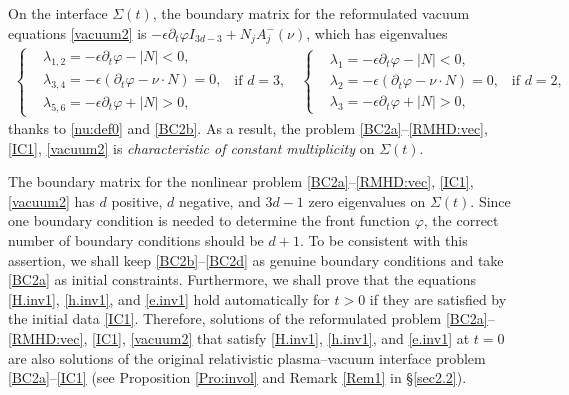 \documentclass[twoside,11pt]{article}
\numberwithin{equation}{section}
\def\p{\partial}
\begin{document}

On the interface $\Sigma(t)$,  the boundary matrix
for the reformulated vacuum equations \eqref{vacuum2}
is $-\epsilon\p_t\varphi I_{3d-3}+N_jA_j^-(\nu)$,
which has eigenvalues
\begin{align*}
\left\{
\begin{aligned}
	&\lambda_{1,2}=-\epsilon\p_t\varphi-|N|<0, \\
	& \lambda_{3,4}=-\epsilon(\p_t\varphi-\nu\cdot N)=0,\\
	& \lambda_{5,6}=-\epsilon\p_t\varphi+|N|>0,
\end{aligned}
\right.\ \  \textrm{if }d=3,\quad
\left\{
\begin{aligned}
	& \lambda_{1}=-\epsilon\p_t\varphi-|N|<0,\\
	& \lambda_{2}=-\epsilon(\p_t\varphi-\nu \cdot N)=0, \\
	& \lambda_{3}=-\epsilon\p_t\varphi+|N|>0,
\end{aligned}
\right.\ \ \textrm{if }d=2,
\end{align*}
thanks to	\eqref{nu:def0} and \eqref{BC2b}.
	As a result, the problem \eqref{BC2a}--\eqref{RMHD:vec}, \eqref{IC1}, \eqref{vacuum2} is {\it characteristic of constant multiplicity} on $\Sigma(t)$.

The boundary matrix for the nonlinear
problem \eqref{BC2a}--\eqref{RMHD:vec}, \eqref{IC1}, \eqref{vacuum2}
 has $d$ positive, $d$ negative, and $3d-1$ zero eigenvalues on $\Sigma(t)$.	
Since one boundary condition is needed to determine the front function $\varphi$,
the correct number of boundary conditions should be $d+1$.
	To be consistent with this assertion, we shall keep \eqref{BC2b}--\eqref{BC2d} as genuine boundary conditions  and take \eqref{BC2a} as initial constraints.
	Furthermore, we shall prove that the equations \eqref{H.inv1}, \eqref{h.inv1}, and \eqref{e.inv1} hold automatically for $t>0$ if they are satisfied by the initial data \eqref{IC1}. Therefore, solutions of the reformulated problem
	 \eqref{BC2a}--\eqref{RMHD:vec}, \eqref{IC1}, \eqref{vacuum2} that satisfy \eqref{H.inv1},  \eqref{h.inv1}, and \eqref{e.inv1} at $t=0$ are also solutions of the original relativistic plasma--vacuum interface problem \eqref{BC2a}--\eqref{IC1} (see Proposition \ref{Pro:invol} and Remark \ref{Rem1} in \S \ref{sec2.2}).
	
\end{document}
